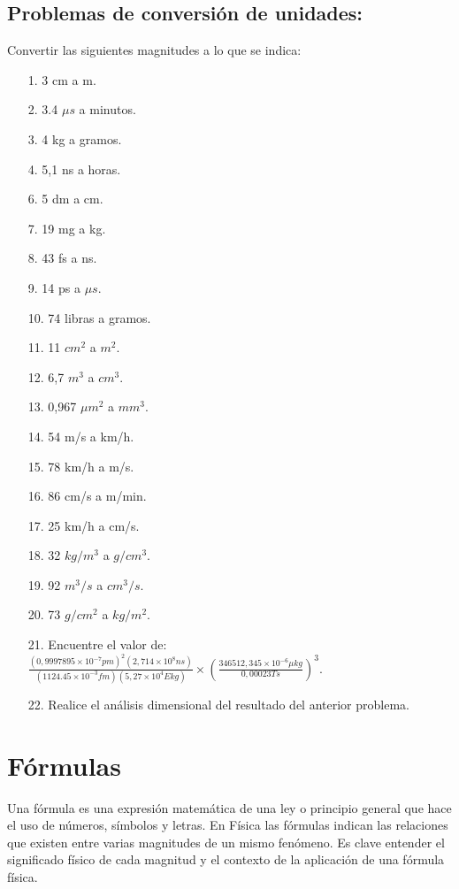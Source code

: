 \documentclass[a5paper,pagesize,10pt,bibtotoc,pointlessnumbers,
normalheadings,DIV=9,fleqn,x11names,table,twoside=false]{scrbook}
\begin{document}
\subsection{Problemas de conversión de unidades:}
Convertir las siguientes magnitudes a lo que se indica:
\begin{itemize}
 \item[1.] 3 cm a m.
 \item[2.] 3.4 $\mu s$ a minutos.
 \item[3.] 4 kg a gramos.
 \item[4.] 5,1 ns a horas.
 \item[6.] 5 dm a cm.
 \item[7.] 19 mg a kg.
 \item[8.] 43 fs a ns.
 \item[9.] 14 ps a $\mu s$.
 \item[10.] 74 libras a gramos.
 \item[11.] 11 $cm^2$ a $m^2$.
 \item[12.] 6,7 $m^3$ a $cm^3$.
 \item[13.] 0,967 $\mu m^2$ a $mm^3$.
 \item[14.] 54 m/s a km/h.
 \item[15.] 78 km/h a m/s.
 \item[16.] 86 cm/s a m/min.
 \item[17.] 25 km/h a cm/s.
 \item[18.] 32 $kg/m^3$ a $g/cm^3$.
 \item[19.] 92 $m^3/s$ a $cm^3/s$.
 \item[20.] 73 $g/cm^2$ a $kg/m^2$.
 \item[21.] Encuentre el valor de:\\
 $\frac{(0,9997895\times 10^{-7}pm)^2(2,714\times 10^8 ns)}{(1124.45\times 10^{-3} fm)(5,27\times 10^4 Ekg)}\times 
\left(\frac{346512,345\times 10^{-6} \mu kg}{0,00023 Ts}\right)^3$.
 \item[22.] Realice el análisis dimensional del resultado del anterior problema.
\end{itemize}

\section{Fórmulas}

Una fórmula es una expresión matemática de una ley o principio general que hace el uso de números, símbolos y letras. En Física 
las fórmulas indican las relaciones que existen entre varias magnitudes de un mismo fenómeno. Es clave entender el significado 
físico de cada magnitud y el contexto de la aplicación de una fórmula física.\\
\end{document}

